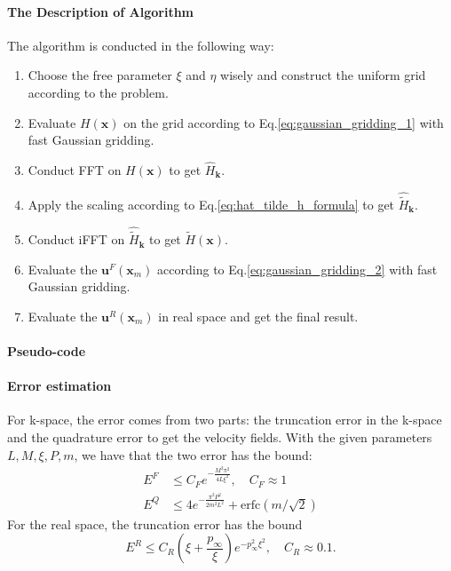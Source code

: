 \documentclass{article}[12pt]
\begin{document}
\paragraph{The Description of Algorithm}
The algorithm is conducted in the following way:
\begin{enumerate}[(1)]
	\item Choose the free parameter $\xi$ and $\eta$ wisely and construct the uniform grid according to the problem.
	\item Evaluate $H(\mathbf{x})$ on the grid according to Eq.\eqref{eq:gaussian_gridding_1} with fast Gaussian gridding.
	\item Conduct FFT on $H(\mathbf{x})$ to get $\hat{H}_{\mathbf{k}}$.
	\item Apply the scaling according to Eq.\eqref{eq:hat_tilde_h_formula} to get $\hat{\tilde{H}}_{\mathbf{k}}$.
	\item Conduct iFFT on $\hat{\tilde{H}}_{\mathbf{k}}$ to get $\tilde{H}(\mathbf{x})$.
	\item Evaluate the $\mathbf{u}^F (\mathbf{x}_m)$ according to Eq.\eqref{eq:gaussian_gridding_2} with fast Gaussian gridding.
	\item Evaluate the $\mathbf{u}^R (\mathbf{x}_m)$ in real space and get the final result.
\end{enumerate}

\paragraph{Pseudo-code}

\paragraph{Error estimation}
For k-space, the error comes from two parts: the truncation error in the k-space and the quadrature error to get the velocity fields. With the given parameters  $L, M, \xi, P, m$, we have that the two error has the bound:
\begin{align}
E^F & \le C_F e^{-\frac{M^2 \pi^2}{4 L \xi^2}}, \quad C_F \approx 1 \\
E^Q & \le  4 e^{- \frac{\pi^2 P^2}{2 m^2 L^2}} + \text{erfc} (m / \sqrt{2})
\end{align}
For the real space, the truncation error has the bound
\begin{equation}
E^R \le C_R (\xi + \frac{p_{\infty}}{\xi}) e^{-p_{\infty}^2 \xi^2}, \quad C_R \approx 0.1.
\end{equation}
\end{document}
